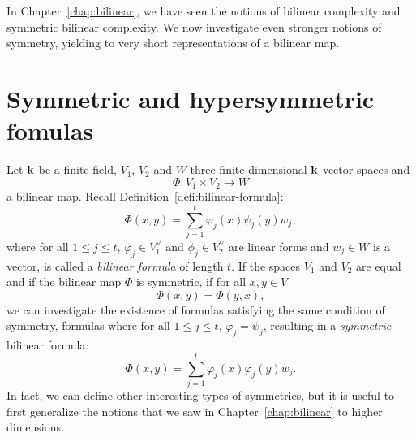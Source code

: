 In Chapter~\ref{chap:bilinear}, we have seen the notions of bilinear complexity
and symmetric bilinear complexity. We now investigate even stronger
notions of symmetry, yielding to very short representations of a bilinear
map.

\minitoc

%
%
%

\clearpage
\section{Symmetric and hypersymmetric fomulas}
%
%
%

Let $\mathbf{k}$ be a finite field, $V_1$, $V_2$ and $W$ three finite-dimensional $\mathbf{k}$-vector
spaces and
\[
  \Phi:V_1\times V_2\to W
\]
a bilinear map. Recall Definition~\ref{defi:bilinear-formula}:
\[
  \Phi(x, y) = \sum_{j=1}^t\varphi_j(x)\psi_j(y)w_j,
\]
where for all $1\leq j\leq t$, $\varphi_j\in V_1^\vee$ and $\phi_j\in V_2^\vee$ are linear forms and
$w_j\in W$ is a vector, is called a \emph{bilinear formula} of length $t$. If
the spaces $V_1$ and $V_2$ are equal and if the bilinear map $\Phi$ is
symmetric, \ie if for all $x, y\in V$
\[
  \Phi(x, y) = \Phi(y, x),
\]
we can investigate the existence of formulas satisfying the same condition of
symmetry, \ie formulas where for all $1\leq j\leq t$, $\varphi_j=\psi_j$,
resulting in a \emph{symmetric} bilinear formula:
\[
  \Phi(x, y) = \sum_{j=1}^t\varphi_j(x)\varphi_j(y)w_j.
\]
In fact, we can define other interesting types of symmetries, but it is useful
to first generalize the notions that we saw in Chapter~\ref{chap:bilinear} to
higher dimensions.

